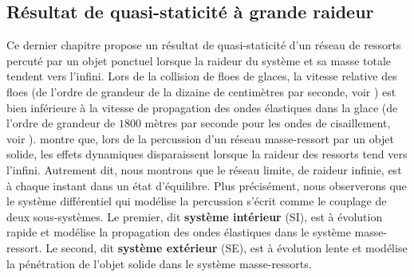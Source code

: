 \subsection{Résultat de quasi-staticité à grande raideur} 
\label{subsubsec:chap6dimitri}


Ce dernier chapitre propose un résultat de quasi-staticité d’un réseau de ressorts percuté par un objet ponctuel lorsque la raideur du système et sa masse totale tendent vers l’infini. Lors de la collision de floes de glaces, la vitesse relative des floes (de l’ordre de grandeur de la dizaine de centimètres par seconde, voir \parencite{rampal2009arctic}) est bien inférieure à la vitesse de propagation des ondes élastiques dans la glace (de l’ordre de grandeur de $1800$ mètres par seconde pour les ondes de cisaillement, voir \parencite{marsan2019characterizing}). \citeauthor{balasoiu2020halthesis} montre que, lors de la percussion d’un réseau masse-ressort par un objet solide, les effets dynamiques disparaissent lorsque la raideur des ressorts tend vers l’infini. Autrement dit, nous montrons que le réseau limite, de raideur infinie, est à chaque instant dans un état d’équilibre. Plus précisément, nous observerons que le système différentiel qui modélise la percussion s’écrit comme le couplage de deux sous-systèmes. Le premier, dit \textbf{système intérieur} (SI), est à évolution rapide et modélise la propagation des ondes élastiques dans le système masse-ressort. Le second, dit \textbf{système extérieur} (SE), est à évolution lente et modélise la pénétration de l’objet solide dans le système masse-ressorts.


